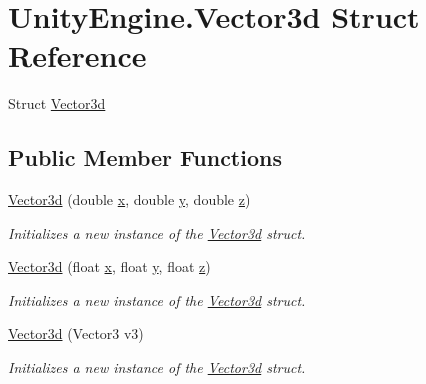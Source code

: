 \hypertarget{struct_unity_engine_1_1_vector3d}{}\section{Unity\+Engine.\+Vector3d Struct Reference}
\label{struct_unity_engine_1_1_vector3d}


Struct \hyperlink{struct_unity_engine_1_1_vector3d}{Vector3d}  


\subsection*{Public Member Functions}
\begin{DoxyCompactItemize}
\item 
\hyperlink{struct_unity_engine_1_1_vector3d_a3743526f0fe72482014117b62ed45c90}{Vector3d} (double \hyperlink{struct_unity_engine_1_1_vector3d_ab84cc8ded7be8d479f6c04351e604e44}{x}, double \hyperlink{struct_unity_engine_1_1_vector3d_a03113ffc1771dfcd797c8a626149e1f1}{y}, double \hyperlink{struct_unity_engine_1_1_vector3d_a328bdd25dcce27f7cd38660ace18f3c3}{z})
\begin{DoxyCompactList}\small\item\em Initializes a new instance of the \hyperlink{struct_unity_engine_1_1_vector3d}{Vector3d} struct. \end{DoxyCompactList}\item 
\hyperlink{struct_unity_engine_1_1_vector3d_a620418a1ce20c867b208f1ac0db8327d}{Vector3d} (float \hyperlink{struct_unity_engine_1_1_vector3d_ab84cc8ded7be8d479f6c04351e604e44}{x}, float \hyperlink{struct_unity_engine_1_1_vector3d_a03113ffc1771dfcd797c8a626149e1f1}{y}, float \hyperlink{struct_unity_engine_1_1_vector3d_a328bdd25dcce27f7cd38660ace18f3c3}{z})
\begin{DoxyCompactList}\small\item\em Initializes a new instance of the \hyperlink{struct_unity_engine_1_1_vector3d}{Vector3d} struct. \end{DoxyCompactList}\item 
\hyperlink{struct_unity_engine_1_1_vector3d_a8be95a112a4e662b16c019ff5be29a55}{Vector3d} (Vector3 v3)
\begin{DoxyCompactList}\small\item\em Initializes a new instance of the \hyperlink{struct_unity_engine_1_1_vector3d}{Vector3d} struct. \end{DoxyCompactList}\item 

\end{DoxyCompactItemize}
